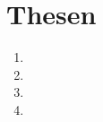 \chapter{Thesen}

\begin{enumerate}
	\item \blindtext
	\item \blindtext
	\item \blindtext
	\item \blindtext
\end{enumerate}